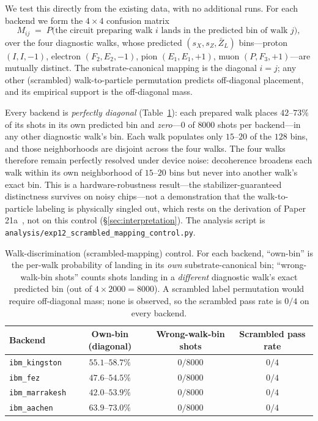 \documentclass[11pt]{article}
\newcommand{\barZ}{\bar Z_L}
\begin{document}
We test this directly from the existing data, with no additional runs.  For each backend we form the $4\times 4$ confusion matrix
\[
  M_{ij} \;=\; P\big(\text{the circuit preparing walk } i \text{ lands in the predicted bin of walk } j\big),
\]
over the four diagnostic walks, whose predicted $(s_X, s_Z, \barZ)$ bins---proton $(I,I,-1)$, electron $(F_2,E_2,-1)$, pion $(E_1,E_1,+1)$, muon $(P,F_3,+1)$---are mutually distinct.  The substrate-canonical mapping is the diagonal $i=j$; any other (scrambled) walk-to-particle permutation predicts off-diagonal placement, and its empirical support is the off-diagonal mass.

Every backend is \emph{perfectly diagonal} (Table~\ref{tab:scrambled-control}): each prepared walk places $42$--$73\%$ of its shots in its own predicted bin and \emph{zero}---$0$ of $8000$ shots per backend---in any other diagnostic walk's bin.  Each walk populates only $15$--$20$ of the $128$ bins, and those neighborhoods are disjoint across the four walks.  The four walks therefore remain perfectly resolved under device noise: decoherence broadens each walk within its own neighborhood of $15$--$20$ bins but never into another walk's exact bin.  This is a hardware-robustness result---the stabilizer-guaranteed distinctness survives on noisy chips---not a demonstration that the walk-to-particle labeling is physically singled out, which rests on the derivation of Paper 21a~\cite{Paper21a}, not on this control (\S\ref{sec:interpretation}).  The analysis script is \texttt{analysis/exp12\_scrambled\_mapping\_control.py}.

\begin{table}[H]
\centering
\caption{Walk-discrimination (scrambled-mapping) control.  For each backend, ``own-bin'' is the per-walk probability of landing in its \emph{own} substrate-canonical bin; ``wrong-walk-bin shots'' counts shots landing in a \emph{different} diagnostic walk's exact predicted bin (out of $4 \times 2000 = 8000$).  A scrambled label permutation would require off-diagonal mass; none is observed, so the scrambled pass rate is $0/4$ on every backend.}
\label{tab:scrambled-control}
\small
\begin{tabular}{lccc}
\toprule
Backend & Own-bin (diagonal) & Wrong-walk-bin shots & Scrambled pass rate \\
\midrule
\texttt{ibm\_kingston}  & $55.1$--$58.7\%$ & $0 / 8000$ & $0/4$ \\
\texttt{ibm\_fez}       & $47.6$--$54.5\%$ & $0 / 8000$ & $0/4$ \\
\texttt{ibm\_marrakesh} & $42.0$--$53.9\%$ & $0 / 8000$ & $0/4$ \\
\texttt{ibm\_aachen}    & $63.9$--$73.0\%$ & $0 / 8000$ & $0/4$ \\
\bottomrule
\end{tabular}
\end{table}
\end{document}
